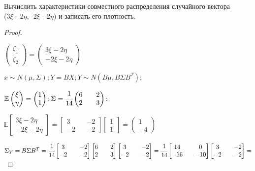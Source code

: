 \begin{problem}
	Вычислить характеристики совместного распределения случайного вектора \\ (3$\xi$ - 2$\eta$, -2$\xi$ - 2$\eta$) и записать его плотность. 
\end{problem}

\begin{proof}
	$ $
	
	$ \begin{pmatrix} \zeta_1 \\ \zeta_2 \end{pmatrix}=\begin{pmatrix} 3\xi-2\eta \\ -2\xi-2\eta \end{pmatrix} $
	
	$ x \sim N(\mu, \Sigma); Y=BX; Y \sim N(B\mu, B\Sigma B^T); $
	
	$ \mathbb E\begin{pmatrix} \xi \\ \eta \end{pmatrix} = \begin{pmatrix} 1 \\ 1 \end{pmatrix}; \Sigma = \cfrac1{14}
	\begin{pmatrix} 6 && 2 \\ 2 && 3 \end{pmatrix}; $ 	

	$ \mathbb E\begin{bmatrix} 3\xi-2\eta \\ -2\xi-2\eta \end{bmatrix}=\begin{bmatrix} 3 && -2 \\ -2 && -2 \end{bmatrix}\begin{bmatrix} 1 \\ 1 \end{bmatrix}=\begin{pmatrix} 1 \\ -4 \end{pmatrix}$	
	
	$ \Sigma_Y=B \Sigma B^T=\cfrac1{14}\begin{bmatrix} 3 && -2 \\ -2 && -2 \end{bmatrix}\begin{bmatrix} 6 && 2 \\ 2 && 3 \end{bmatrix}\begin{bmatrix} 3 && -2 \\ -2 && -2 \end{bmatrix}=\cfrac1{14}\begin{bmatrix} 14 && 0 \\ -16 && -10 \end{bmatrix}\begin{bmatrix} 3 && -2 \\ -2 && -2 \end{bmatrix}=$ 	
	

\end{proof}
